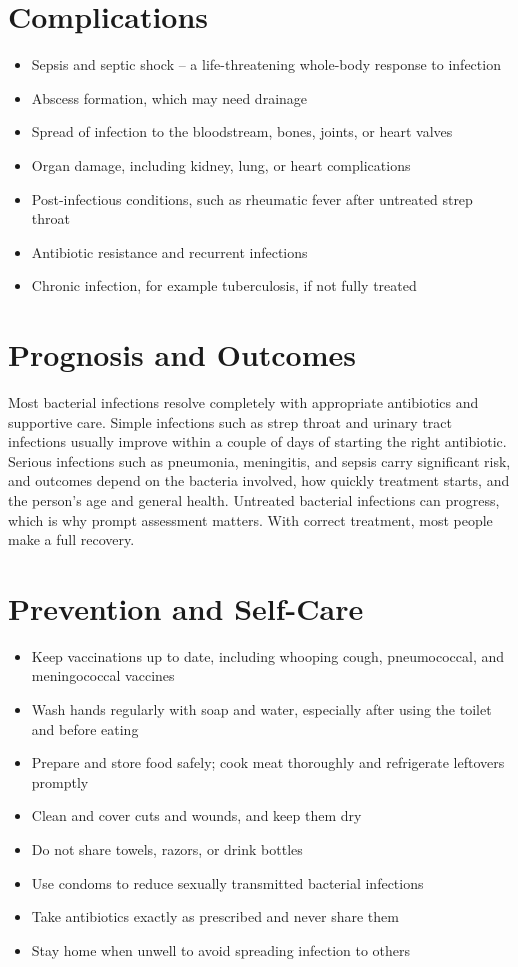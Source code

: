 \section*{Complications}
\begin{itemize}
    \item Sepsis and septic shock -- a life-threatening whole-body response to infection
    \item Abscess formation, which may need drainage
    \item Spread of infection to the bloodstream, bones, joints, or heart valves
    \item Organ damage, including kidney, lung, or heart complications
    \item Post-infectious conditions, such as rheumatic fever after untreated strep throat
    \item Antibiotic resistance and recurrent infections
    \item Chronic infection, for example tuberculosis, if not fully treated
\end{itemize}

\section*{Prognosis and Outcomes}
Most bacterial infections resolve completely with appropriate antibiotics and supportive care. Simple infections such as strep throat and urinary tract infections usually improve within a couple of days of starting the right antibiotic. Serious infections such as pneumonia, meningitis, and sepsis carry significant risk, and outcomes depend on the bacteria involved, how quickly treatment starts, and the person's age and general health. Untreated bacterial infections can progress, which is why prompt assessment matters. With correct treatment, most people make a full recovery.

\section*{Prevention and Self-Care}
\begin{itemize}
    \item Keep vaccinations up to date, including whooping cough, pneumococcal, and meningococcal vaccines
    \item Wash hands regularly with soap and water, especially after using the toilet and before eating
    \item Prepare and store food safely; cook meat thoroughly and refrigerate leftovers promptly
    \item Clean and cover cuts and wounds, and keep them dry
    \item Do not share towels, razors, or drink bottles
    \item Use condoms to reduce sexually transmitted bacterial infections
    \item Take antibiotics exactly as prescribed and never share them
    \item Stay home when unwell to avoid spreading infection to others
\end{itemize}

